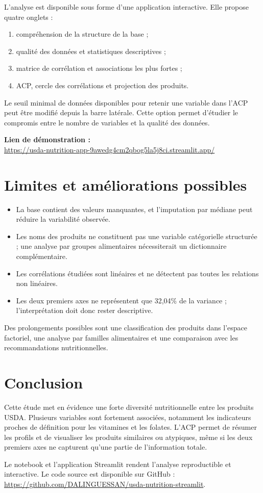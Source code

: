 \documentclass[12pt,a4paper]{article}
\begin{document}
L'analyse est disponible sous forme d'une application interactive. Elle propose quatre onglets :
\begin{enumerate}
    \item compréhension de la structure de la base ;
    \item qualité des données et statistiques descriptives ;
    \item matrice de corrélation et associations les plus fortes ;
    \item ACP, cercle des corrélations et projection des produits.
\end{enumerate}

Le seuil minimal de données disponibles pour retenir une variable dans l'ACP peut être modifié depuis la barre latérale. Cette option permet d'étudier le compromis entre le nombre de variables et la qualité des données.

\medskip
\noindent\textbf{Lien de démonstration :}\\
\url{https://usda-nutrition-app-9awedg4cm2qbog5la5j8ci.streamlit.app/}

\section{Limites et améliorations possibles}

\begin{itemize}
    \item La base contient des valeurs manquantes, et l'imputation par médiane peut réduire la variabilité observée.
    \item Les noms des produits ne constituent pas une variable catégorielle structurée ; une analyse par groupes alimentaires nécessiterait un dictionnaire complémentaire.
    \item Les corrélations étudiées sont linéaires et ne détectent pas toutes les relations non linéaires.
    \item Les deux premiers axes ne représentent que 32,04\% de la variance ; l'interprétation doit donc rester descriptive.
\end{itemize}

Des prolongements possibles sont une classification des produits dans l'espace factoriel, une analyse par familles alimentaires et une comparaison avec les recommandations nutritionnelles.

\section{Conclusion}

Cette étude met en évidence une forte diversité nutritionnelle entre les produits USDA. Plusieurs variables sont fortement associées, notamment les indicateurs proches de définition pour les vitamines et les folates. L'ACP permet de résumer les profils et de visualiser les produits similaires ou atypiques, même si les deux premiers axes ne capturent qu'une partie de l'information totale.

Le notebook et l'application Streamlit rendent l'analyse reproductible et interactive. Le code source est disponible sur GitHub :
\url{https://github.com/DALINGUESSAN/usda-nutrition-streamlit}.
\end{document}
